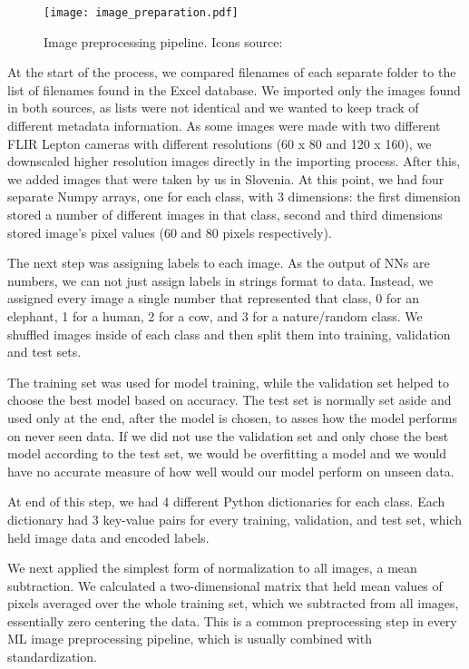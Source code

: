 \begin{figure}[ht]
    \centering
    \texttt{[image: image\_preparation.pdf]} 
    \caption[Image preprocessing pipeline.]{Image preprocessing pipeline. Icons source:\cite{icons}}
    \label{image_preparation}
\end{figure}

At the start of the process, we compared filenames of each separate folder to the list of filenames found in the Excel database.
We imported only the images found in both sources, as lists were not identical and we wanted to keep track of different metadata information.
As some images were made with two different FLIR Lepton cameras with different resolutions (60 x 80 and 120 x 160), we downscaled higher resolution images directly in the importing process.
After this, we added images that were taken by us in Slovenia.
At this point, we had four separate Numpy arrays, one for each class, with 3 dimensions: the first dimension stored a number of different images in that class, second and third dimensions stored image's pixel values (60 and 80 pixels respectively).

The next step was assigning labels to each image.
As the output of NNs are numbers, we can not just assign labels in strings format to data.
Instead, we assigned every image a single number that represented that class, 0 for an elephant, 1 for a human, 2 for a cow, and 3 for a nature/random class.
We shuffled images inside of each class and then split them into training, validation and test sets.

The training set was used for model training, while the validation set helped to choose the best model based on accuracy.
The test set is normally set aside and used only at the end, after the model is chosen, to asses how the model performs on never seen data.
If we did not use the validation set and only chose the best model according to the test set, we would be overfitting a model and we would have no accurate measure of how well would our model perform on unseen data.

At end of this step, we had 4 different Python dictionaries for each class.
Each dictionary had 3 key-value pairs for every training, validation, and test set, which held image data and encoded labels.

We next applied the simplest form of normalization to all images, a mean subtraction.
We calculated a two-dimensional matrix that held mean values of pixels averaged over the whole training set, which we subtracted from all images, essentially zero centering the data.
This is a common preprocessing step in every ML image preprocessing pipeline, which is usually combined with standardization\footnotemark.

